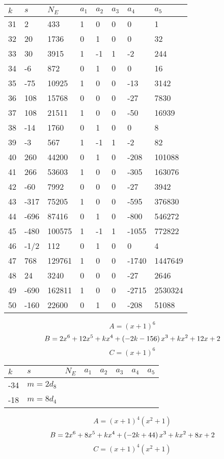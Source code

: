 \documentclass{amsart}
\begin{document}
\begin{longtable}{|l|l|l|lllll|}
\hline
$k$ & $s$ & $N_E$ & $a_1$ & $a_2$ & $a_3$ & $a_4$ & $a_5$\\
\hline
31&2&433&1&0&0&0&1\\
32&20&1736&0&1&0&0&32\\
33&30&3915&1&-1&1&-2&244\\
34&-6&872&0&1&0&0&16\\
35&-75&10925&1&0&0&-13&3142\\
36&108&15768&0&0&0&-27&7830\\
37&108&21511&1&0&0&-50&16939\\
38&-14&1760&0&1&0&0&8\\
39&-3&567&1&-1&1&-2&82\\
40&260&44200&0&1&0&-208&101088\\
41&266&53603&1&0&0&-305&163076\\
42&-60&7992&0&0&0&-27&3942\\
43&-317&75205&1&0&0&-595&376830\\
44&-696&87416&0&1&0&-800&546272\\
45&-480&100575&1&-1&1&-1055&772822\\
46&-1/2&112&0&1&0&0&4\\
47&768&129761&1&0&0&-1740&1447649\\
48&24&3240&0&0&0&-27&2646\\
49&-690&162811&1&0&0&-2715&2530324\\
50&-160&22600&0&1&0&-208&51088\\
\hline
\end{longtable}
$$A=(x
 + 1)^{6}$$
$$B=2\*x^6
 + 12\*x^5
 + k\*x^4
 + \left(-2\*k
 - 156\right) \*x^3
 + k\*x^2
 + 12\*x
 + 2$$
$$C=(x
 + 1)^{6}$$
\begin{longtable}{|l|l|l|lllll|}
\hline
$k$ & $s$ & $N_E$ & $a_1$ & $a_2$ & $a_3$ & $a_4$ & $a_5$\\
\hline
-34&$m=2d_{8}$&&\multicolumn{5}{c|}{}\\
-18&$m=8d_{4}$&&\multicolumn{5}{c|}{}\\
\hline
\end{longtable}
$$A=(x
 + 1)^{4}(x^2
 + 1)$$
$$B=2\*x^6
 + 8\*x^5
 + k\*x^4
 + \left(-2\*k
 + 44\right) \*x^3
 + k\*x^2
 + 8\*x
 + 2$$
$$C=(x
 + 1)^{4}(x^2
 + 1)$$
\end{document}
